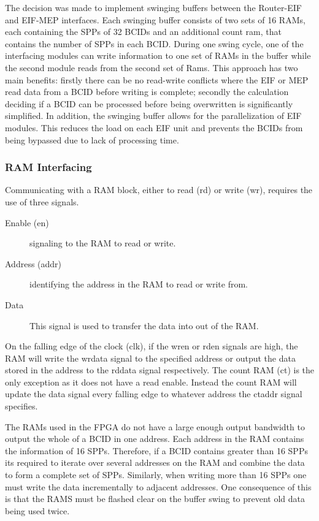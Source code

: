 		The decision was made to implement swinging buffers between the Router-EIF and EIF-MEP interfaces.
		Each swinging buffer consists of two sets of 16 RAMs, each containing the SPPs of 32 BCIDs and an additional count ram, that contains the number of SPPs in each BCID.
		During one swing cycle, one of the interfacing modules can write information to one set of RAMs in the buffer while the second module reads from the second set of Rams.
		This approach has two main benefits: firstly there can be no read-write conflicts where the EIF or MEP read data from a BCID before writing is complete; secondly the calculation deciding if a BCID can be processed before being overwritten is significantly simplified.
		In addition, the swinging buffer allows for the parallelization of EIF modules.
		This reduces the load on each EIF unit and prevents the BCIDs from being bypassed due to lack of processing time.

		\subsubsection{RAM Interfacing} %
		\label{sub:ram_interfacing}
			

			Communicating with a RAM block, either to read (rd) or write (wr), requires the use of three signals.

			\begin{description}
				\item [Enable (en)] signaling to the RAM to read or write.
				\item [Address (addr)] identifying the address in the RAM to read or write from.
				\item [Data] This signal is used to transfer the data into out of the RAM.
			\end{description}

			On the falling edge of the clock (clk), if the wr\textunderscore en or rd\textunderscore en signals are high, the RAM will write the wr\textunderscore data signal to the specified address or output the data stored in the address to the rd\textunderscore data signal respectively. 
			The count RAM (ct) is the only exception as it does not have a read enable.
			Instead the count RAM will update the data signal every falling edge to whatever address the ct\textunderscore addr signal specifies.

			The RAMs used in the FPGA do not have a large enough output bandwidth to output the whole of a BCID in one address.
			Each address in the RAM contains the information of 16 SPPs.
			Therefore, if a BCID contains greater than 16 SPPs its required to iterate over several addresses on the RAM and combine the data to form a complete set of SPPs.
			Similarly, when writing more than 16 SPPs one must write the data incrementally to adjacent addresses.
			One consequence of this is that the RAMS must be flashed clear on the buffer swing to prevent old data being used twice.

